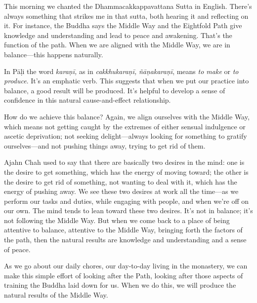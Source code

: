 This morning we chanted the Dhammacakkappavattana Sutta in English. 
There's always something that strikes me in that sutta, both hearing it 
and reflecting on it. For instance, the Buddha says the Middle Way and 
the Eightfold Path give knowledge and understanding and lead to peace 
and awakening. That's the function of the path. When we are aligned 
with the Middle Way, we are in balance---this happens naturally.

In Pāḷi the word \emph{karaṇī,} as in \emph{cakkhukaraṇī,} 
\emph{ñāṇakaraṇī}, means \emph{to make} or \emph{to produce}. 
It's an emphatic verb. This suggests that when we put our practice into 
balance, a good result will be produced. It's helpful to develop a 
sense of confidence in this natural cause-and-effect relationship.

How do we achieve this balance? Again, we align ourselves with the 
Middle Way, which means not getting caught by the extremes of either 
sensual indulgence or ascetic deprivation; not seeking delight---always 
looking for something to gratify ourselves---and not pushing things 
away, trying to get rid of them.

Ajahn Chah used to say that there are basically two desires in the 
mind: one is the desire to get something, which has the energy of 
moving toward; the other is the desire to get rid of something, not 
wanting to deal with it, which has the energy of pushing away. We see 
these two desires at work all the time---as we perform our tasks and 
duties, while engaging with people, and when we're off on our own. The 
mind tends to lean toward these two desires. It's not in balance; it's 
not following the Middle Way. But when we come back to a place of being 
attentive to balance, attentive to the Middle Way, bringing forth the 
factors of the path, then the natural results are knowledge and 
understanding and a sense of peace.

As we go about our daily chores, our day-to-day living in the 
monastery, we can make this simple effort of looking after the Path, 
looking after those aspects of training the Buddha laid down for us. 
When we do this, we will produce the natural results of the Middle Way.


